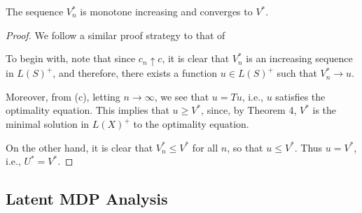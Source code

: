 \begin{thm}\label{thm: value-convergence}
    The sequence \( V_n^* \) is monotone increasing and converges to \( V^* \).
   
\end{thm}

\begin{proof} 

We follow a similar proof strategy to that of \citet[Theorem 5.1]{hernandez1992discrete}

 To begin with, note that since \( c_n \uparrow c \), it is clear that \( V_n^{*} \) is an increasing sequence in \( L(S)^+ \), and therefore, there exists a function \( u \in L(S)^+ \) such that \( V_n^* \to  u \).

Moreover, from (c), letting \( n \to \infty \), we see that \( u = T u \), i.e., \( u \) satisfies the optimality equation. This implies that \( u \geq V^* \), since, by Theorem 4, \( V^* \) is the minimal solution in \( L(X)^+ \) to the optimality equation.

On the other hand, it is clear that \( V_n^{*} \leq V^* \) for all \( n \), so that \( u \leq V^* \). Thus \( u = V^* \), i.e., \( U^* = V^* \).



\end{proof}

\subsection{Latent MDP Analysis}\label{sec: equi}

